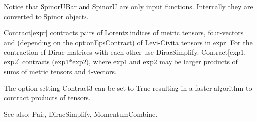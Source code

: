 
Notice that SpinorUBar and SpinorU are only input functions. Internally they are converted to Spinor objects.



Contract[expr] contracts pairs of Lorentz indices of metric tensors, four-vectors and (depending on the optionEpsContract) of Levi-Civita
  tensors in expr. For the contraction of Dirac matrices with each other use DiracSimplify. Contract[exp1, exp2] contracts (exp1*exp2),
  where exp1 and exp2 may be larger products of sums of metric tensors and 4-vectors. 



The option setting Contract3 can be set to True resulting in a faster algorithm to contract products of tensors.

See also:  Pair, DiracSimplify, MomentumCombine.








